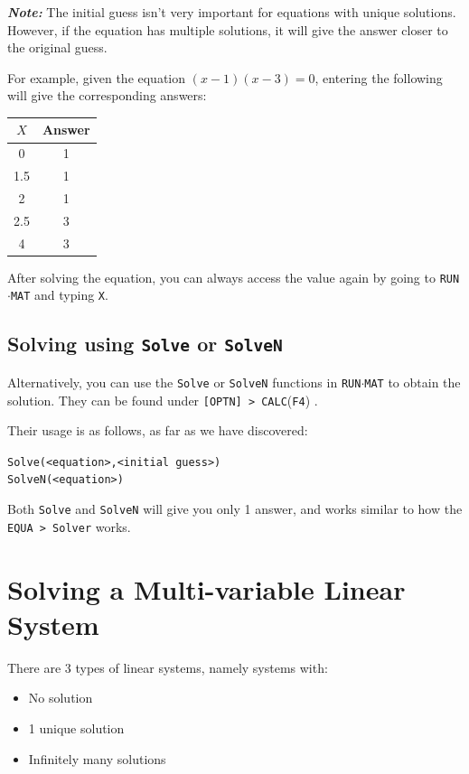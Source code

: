 \documentclass[a5paper]{memoir}
\def\code#1{\texttt{#1}}
\def\note#1{\textcolor[HTML]{109fa9}{\textbf{\textit{Note:}}} #1}
\def\runmat{\code{RUN$\cdot$MAT} }
\def\Ffour{(\code{F4}) }
\begin{document}
\note{}The initial guess isn't very important for equations with unique solutions. However, if the equation has multiple solutions, it will give the answer closer to the original guess.

For example, given the equation $(x-1)(x-3)=0$, entering the following will give the corresponding answers:
\begin{center}
	\renewcommand{\arraystretch}{1.2}
	\begin{tabular}{|c|c|}
		\hline
		$X$ 	& Answer \\
		\hline
		0		& 1 \\
		\hline
		1.5 	& 1 \\
		\hline
		2		& 1 \\
		\hline
		2.5		& 3 \\
		\hline
		4		& 3 \\
		\hline
	\end{tabular}
\end{center}

After solving the equation, you can always access the value again by going to \runmat and typing \code{X}.

\subsection{Solving using \code{Solve} or \code{SolveN}}
Alternatively, you can use the \code{Solve} or \code{SolveN} functions in \runmat to obtain the solution. They can be found under \code{[OPTN] > CALC}\Ffour.

Their usage is as follows, as far as we have discovered:
\begin{center}
	\code{Solve(<equation>,<initial guess>)} \\
	\code{SolveN(<equation>)}
\end{center}

Both \code{Solve} and \code{SolveN} will give you only 1 answer, and works similar to how the \code{EQUA > Solver} works.

\section{Solving a Multi-variable Linear System}
There are 3 types of linear systems, namely systems with:
\begin{itemize}
	\item No solution
	\item 1 unique solution
	\item Infinitely many solutions
\end{itemize}
\end{document}
